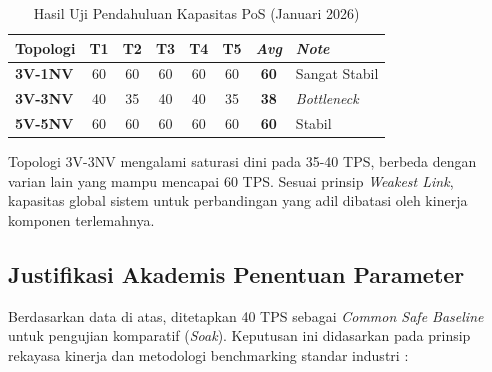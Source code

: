 \begin{table}[htbp]
\centering
\caption{Hasil Uji Pendahuluan Kapasitas PoS (Januari 2026)}
\label{tab:prelim_pos}
\begin{tabular}{|l|c|c|c|c|c|c|l|}
\hline
\textbf{Topologi} & \textbf{T1} & \textbf{T2} & \textbf{T3} & \textbf{T4} & \textbf{T5} & \textbf{\textit{Avg}} & \textbf{\textit{Note}} \\ \hline
\textbf{3V-1NV} & 60 & 60 & 60 & 60 & 60 & \textbf{60} & Sangat Stabil \\ \hline
\textbf{3V-3NV} & 40 & 35 & 40 & 40 & 35 & \textbf{38} & \textit{Bottleneck} \\ \hline
\textbf{5V-5NV} & 60 & 60 & 60 & 60 & 60 & \textbf{60} & Stabil \\ \hline
\end{tabular}
\end{table}

Topologi 3V-3NV mengalami saturasi dini pada 35-40 TPS, berbeda dengan varian lain yang mampu mencapai 60 TPS. Sesuai prinsip \textit{Weakest Link}, kapasitas global sistem untuk perbandingan yang adil dibatasi oleh kinerja komponen terlemahnya.

\subsection{Justifikasi Akademis Penentuan Parameter}
Berdasarkan data di atas, ditetapkan 40 TPS sebagai \textit{Common Safe Baseline} untuk pengujian komparatif (\textit{Soak}). Keputusan ini didasarkan pada prinsip rekayasa kinerja dan metodologi benchmarking standar industri \cite{spec2019}:

